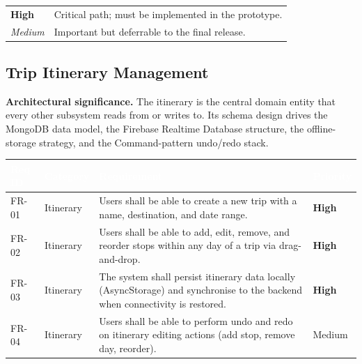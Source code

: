 \documentclass[12pt, a4paper]{article}
\newcommand{\reqid}[1]{\textsc{\small #1}}
\newcommand{\high}{\textbf{High}}
\newcommand{\medium}{Medium}
\newcommand{\thcell}[1]{\textcolor{white}{\textbf{\small #1}}}
\begin{document}
\vspace{0.6em}
\noindent
\begin{tabular}{ll}
  \textbf{High}   & Critical path; must be implemented in the prototype. \\
  \textit{Medium} & Important but deferrable to the final release.        \\
\end{tabular}

\subsection{Trip Itinerary Management}

\begin{tcolorbox}[notebox]
  \textbf{Architectural significance.} The itinerary is the central domain entity that every other subsystem reads from or writes to. Its schema design drives the MongoDB data model, the Firebase Realtime Database structure, the offline-storage strategy, and the Command-pattern undo/redo stack.
\end{tcolorbox}

\vspace{0.4em}
\begin{longtable}{C{1.6cm} C{2.0cm} L{8.2cm} C{1.8cm}}
\toprule
{}
\thcell{Req ID} & \thcell{Category} & \thcell{Requirement} & \thcell{Priority} \\
\midrule
\endhead
\bottomrule
\endfoot

\reqid{FR-01} & Itinerary &
Users shall be able to create a new trip with a name, destination, and date range. &
\high \\

\reqid{FR-02} & Itinerary &
Users shall be able to add, edit, remove, and reorder stops within any day of a trip via drag-and-drop. &
\high \\

\reqid{FR-03} & Itinerary &
The system shall persist itinerary data locally (AsyncStorage) and synchronise to the backend when connectivity is restored. &
\high \\

\reqid{FR-04} & Itinerary &
Users shall be able to perform undo and redo on itinerary editing actions (add stop, remove day, reorder). &
\medium \\

\end{longtable}
\end{document}

